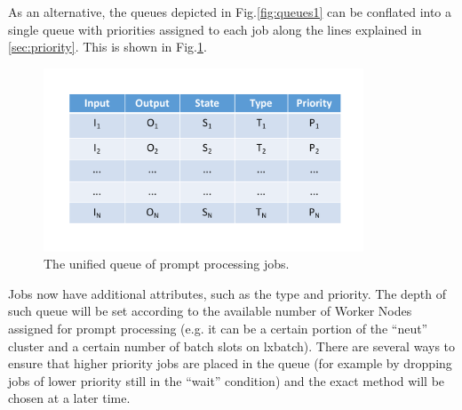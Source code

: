 \documentclass[pdftex,12pt,letter]{article}
\begin{document}
As an alternative, the queues depicted in Fig.\ref{fig:queues1} can be conflated into a single queue
with priorities assigned to each job along the lines explained in \ref{sec:priority}. This is shown in
Fig.\ref{fig:queues2}.
\begin{figure}[tbh]
  \centering
  \includegraphics[width=0.85\textwidth]{figures/prompt_queues_2.pdf}
  \caption{The unified queue of prompt processing jobs.}
  \label{fig:queues2}
\end{figure}
Jobs now have additional attributes, such as the type and priority.
The depth of such queue will be set according to the available number of Worker Nodes assigned for
prompt processing (e.g. it can be a certain portion of the ``neut'' cluster and a certain number of batch slots on
lxbatch). There are several ways to ensure that higher priority jobs are placed in the queue (for example by
dropping jobs of lower priority still in the ``wait'' condition) and the exact method will be chosen at a later time.
\end{document}
